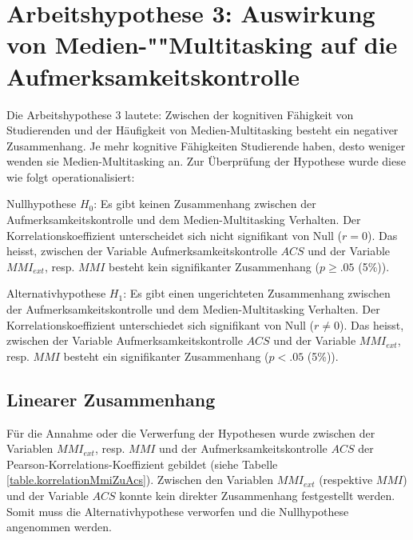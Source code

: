 \section{Arbeitshypothese 3: Auswirkung von Medien-""Multitasking auf die Aufmerksamkeitskontrolle}\label{label.ergebnisse.arbeitshypothese3}
Die Arbeitshypothese 3 lautete: Zwischen der kognitiven Fähigkeit von Studierenden und der Häufigkeit von Medien-Multitasking besteht ein negativer Zusammenhang. Je mehr kognitive Fähigkeiten Studierende haben, desto weniger wenden sie Medien-Multitasking an. Zur Überprüfung der Hypothese wurde diese wie folgt operationalisiert:
\par
Nullhypothese $H_{0}$: Es gibt keinen Zusammenhang zwischen der Aufmerksamkeitskontrolle und dem Medien-Multitasking Verhalten. Der Korrelationskoeffizient unterscheidet sich nicht signifikant von Null ($r=0$). Das heisst, zwischen der Variable Aufmerksamkeitskontrolle $ACS$ und der Variable $MMI_{ext}$, resp. $MMI$ besteht kein signifikanter Zusammenhang ($p \geq .05$ (5\%)).
\par
Alternativhypothese $H_{1}$: Es gibt einen ungerichteten Zusammenhang zwischen der Aufmerksamkeitskontrolle und dem Medien-Multitasking Verhalten. Der Korrelationskoeffizient unterschiedet sich signifikant von Null ($r \neq 0$). Das heisst, zwischen der Variable Aufmerksamkeitskontrolle $ACS$ und der Variable $MMI_{ext}$, resp. $MMI$ besteht ein signifikanter Zusammenhang ($p < .05$ (5\%)).

\subsection{Linearer Zusammenhang}
Für die Annahme oder die Verwerfung der Hypothesen wurde zwischen der Variablen $MMI_{ext}$, resp. $MMI$ und der Aufmerksamkeitskontrolle $ACS$ der Pearson-Korrelations-Koeffizient gebildet (siehe Tabelle \ref{table.korrelationMmiZuAcs}). Zwischen den Variablen $MMI_{ext}$ (respektive $MMI$) und der Variable $ACS$ konnte kein direkter Zusammenhang festgestellt werden. Somit muss die Alternativhypothese verworfen und die Nullhypothese angenommen werden.

